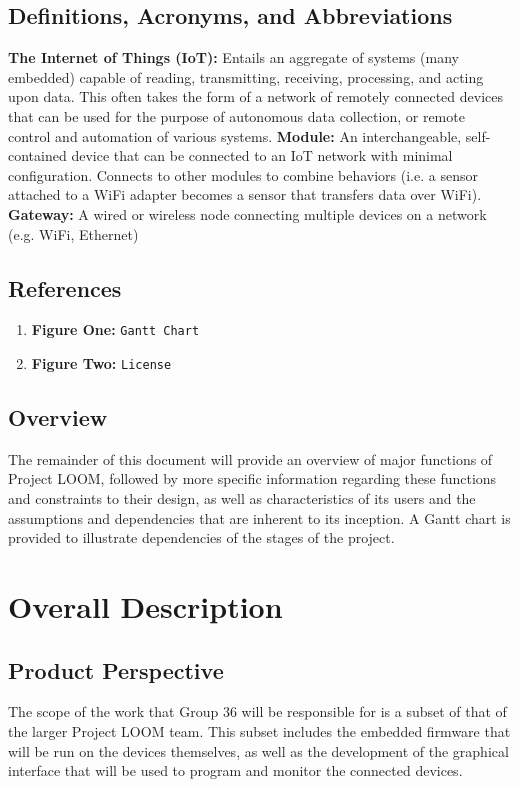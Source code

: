 \documentclass[onecolumn, draftclsnofoot,10pt, compsoc]{IEEEtran}
\begin{document}
	\subsection{Definitions, Acronyms, and Abbreviations}
	\textbf{The Internet of Things (IoT):} Entails an aggregate of systems (many embedded) capable of reading, transmitting, receiving, processing, and acting upon data. This often takes the form of a network of remotely connected devices that can be used for the purpose of autonomous data collection, or remote control and automation of various systems. \newline
	\textbf{Module:} An interchangeable, self-contained device that can be connected to an IoT network with minimal configuration. Connects to other modules to combine behaviors (i.e. a sensor attached to a WiFi adapter becomes a sensor that transfers data over WiFi). \newline
	\textbf{Gateway:} A wired or wireless node connecting multiple devices on a network (e.g. WiFi, Ethernet) \newline

	\subsection{References}
	\begin{enumerate}
		\item \textbf{Figure One:} \texttt{Gantt Chart}
		\item \textbf{Figure Two:} \texttt{License}
	\end{enumerate}
	
	\subsection{Overview}
	The remainder of this document will provide an overview of major functions of Project LOOM, followed by more specific information regarding these functions and constraints to their design, as well as characteristics of its users and the assumptions and dependencies that are inherent to its inception. A Gantt chart is provided to illustrate dependencies of the stages of the project.

\section{Overall Description}
	\subsection{Product Perspective}
	The scope of the work that Group 36 will be responsible for is a subset of that of the larger Project LOOM team. This subset includes the embedded firmware that will be run on the devices themselves, as well as the development of the graphical interface that will be used to program and monitor the connected devices.
\end{document}
